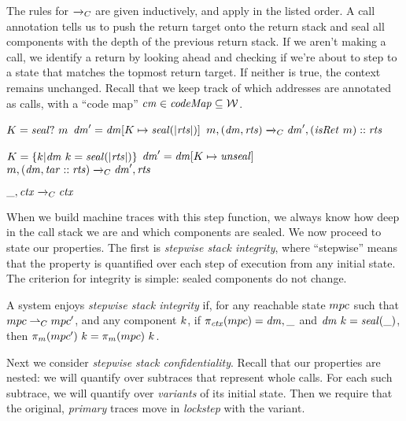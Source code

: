 \documentclass[acmsmall,review,anonymous]{acmart}\settopmatter{printfolios=true,printccs=false,printacmref=false}
\begin{document}
The rules for \(\xrightarrow{}_C\) are given inductively, and apply in the listed order.
A call annotation tells us to push the return target onto the return stack and
seal all components with the depth of the previous return stack. If we aren't making a call,
we identify a return by looking ahead and checking if we're about to step to a state
that matches the topmost return target. If neither is true, the context remains unchanged.
%
Recall that we keep track of which addresses are
annotated as calls, with a ``code map'' $\mathit{cm} \in \mathit{codeMap} \subseteq
{\mathcal W}$.

\judgmentthree[ Call]
              {\(\codemap ~ (\mach ~ \PCname) = \callmap\)}
              {\(K = \mathit{seal?} ~ m\)}
              {\(\mathit{dm}' = \mathit{dm}[K \mapsto \mathit{seal(|\mathit{rts}|)}]\)}
                {\(m,(\mathit{dm},\mathit{rts}) \xrightarrow{}_C \mathit{dm}',(\mathit{isRet} ~ m)::\mathit{rts}\)}

\vspace*{-1ex}
              {\(K = \{k | \mathit{dm} ~ k = \mathit{seal(|\mathit{rts}|)}\}\)}
              {\(\mathit{dm}' = \mathit{dm}[K \mapsto \mathit{unseal}]\)}
              {\(m,(\mathit{dm},\mathit{tar}::\mathit{rts}) \xrightarrow{}_C \mathit{dm}',\mathit{rts}\)}

\vspace*{-3.5ex}
\judgment[ Default]
         {}
         {\(\_,\mathit{ctx} \xrightarrow{}_C \mathit{ctx}\)}

When we build machine traces with this step function, we always know how deep in the
call stack we are and which components are sealed. We now proceed to state our properties.
The first is {\em stepwise stack integrity}, where ``stepwise'' means that the property is
quantified over each step of execution from any initial state. The criterion for integrity
is simple: sealed components do not change.

 A system enjoys {\em stepwise stack integrity} if, for any reachable state
\(mpc\) such that \(mpc \overset{}{\rightharpoonup}_C mpc'\),
and any component \(k\), if \(\pi_{\mathit{ctx}}(mpc) = \mathit{dm},\_\) and
\(\mathit{dm} ~ k = \mathit{seal(\_)}\), then \(\pi_m(mpc') ~ k =
\pi_m(mpc) ~ k\).

Next we consider {\em stepwise stack confidentiality}. Recall that our properties are
nested: we will quantify over subtraces that represent whole calls. For each such
subtrace, we will quantify over {\em variants} of its initial state. Then we require
that the original, {\em primary} traces move in {\em lockstep} with the variant.
\end{document}
